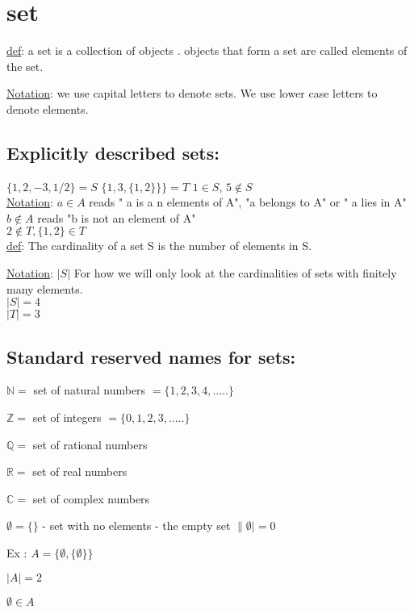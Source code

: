 \documentclass{article}
\author{Paul Chiramel}
\date{01/09/23}
\begin{document}
\section{set}


\underline{def}: a set is a collection of objects . objects that form a set are called elements of the set.

\noindent\underline{Notation}: we use capital letters to denote sets. We use lower case letters to denote elements.




\subsection{Explicitly described sets:}

$\{ 1,2,-3,1/2 \} = S $
$\{1,3,\{1,2\}\}\} = T$
$1 \in S$,
$5 \notin S$
\\\underline{Notation}: $a \in A$ reads " a is a n elements of A", "a belongs to A" or " a lies in A" %
$b \notin A$ reads "b is not an element of A"
\\
$2 \notin T, \{1,2\} \in T$\\
\noindent\underline{def}: The cardinality of a set S is the number of elements in S.

\noindent\underline{Notation}: $\vert S\vert$
For how we will only look at the cardinalities of sets with finitely many elements.
\\
$|S| = 4$
\\
$|T| = 3$

\subsection{Standard reserved names for sets:}

$\mathbb{N}  =$ set of natural numbers $= \{1,2,3,4,.....\}$

\noindent$\mathbb{Z} =$ set of integers $= \{0,1,2,3,.....\}$

\noindent$\mathbb{Q} =$ set of rational numbers

\noindent$\mathbb{R} =$ set of real numbers

\noindent$\mathbb{C} =$ set of complex numbers

\noindent$\emptyset = \{\}$ - set with no elements
- the empty set
$\|\emptyset| = 0$

Ex : $A = \{\emptyset, \{\emptyset\}\}$

\indent\indent$|A| = 2$

\indent\indent$\emptyset \in A$
\end{document}
